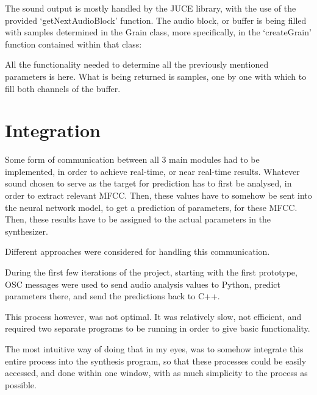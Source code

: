 The sound output is mostly handled by the JUCE library, with the use
of the provided `getNextAudioBlock' function. The audio block, or
buffer is being filled with samples determined in the Grain class,
more specifically, in the `createGrain' function contained within that
class:


All the functionality needed to determine all the previously mentioned
parameters is  here. What is being returned is samples, one by one
with which to fill both channels of the buffer.


%

\section{Integration}

Some form of communication between all 3 main modules had to be
implemented, in order to achieve real-time, or near real-time
results. Whatever sound chosen to serve as the target for prediction
has to first be analysed, in order to extract relevant MFCC. Then,
these values have to somehow be sent into the neural network model, to
get a prediction of parameters, for these MFCC. Then, these results
have to be assigned to the actual parameters in the synthesizer.

Different approaches were considered for handling this communication.

During the first few iterations of the project, starting with the
first prototype, OSC messages were used to send audio analysis values
to Python, predict parameters there, and send the predictions back to
C++.

This process however, was not optimal. It was relatively slow, not
efficient, and required two separate programs to be running in order
to give basic functionality.

The most intuitive way of doing that in my eyes, was to somehow
integrate this entire process into the synthesis program, so that
these processes could be easily accessed, and done within one window,
with as much simplicity to the process as possible.


